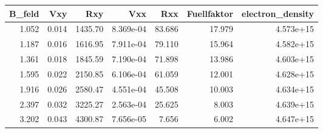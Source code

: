 \begin{tabular}{rrrrrrr}
\toprule
 B\_feld &    Vxy &      Rxy &        Vxx &     Rxx &  Fuellfaktor &  electron\_density \\
\midrule
  1.052 &  0.014 &  1435.70 &  8.369e-04 &  83.686 &       17.979 &         4.573e+15 \\
  1.187 &  0.016 &  1616.95 &  7.911e-04 &  79.110 &       15.964 &         4.582e+15 \\
  1.361 &  0.018 &  1845.59 &  7.190e-04 &  71.898 &       13.986 &         4.603e+15 \\
  1.595 &  0.022 &  2150.85 &  6.106e-04 &  61.059 &       12.001 &         4.628e+15 \\
  1.916 &  0.026 &  2580.47 &  4.551e-04 &  45.508 &       10.003 &         4.634e+15 \\
  2.397 &  0.032 &  3225.27 &  2.563e-04 &  25.625 &        8.003 &         4.639e+15 \\
  3.202 &  0.043 &  4300.87 &  7.656e-05 &   7.656 &        6.002 &         4.647e+15 \\
\bottomrule
\end{tabular}
